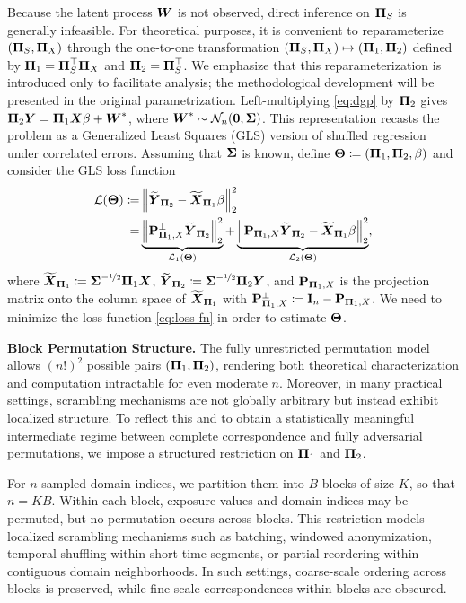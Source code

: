 \documentclass[numsec,webpdf,modern,medium,namedate]{oup-authoring-template}
\theoremstyle{thmstyleone}%
\theoremstyle{thmstyletwo}%
\theoremstyle{thmstylethree}%
\begin{document}
Because the latent process $\boldsymbol{W}$ is not observed, direct inference on $\boldsymbol{\Pi}_S$ is generally infeasible. For theoretical purposes, it is convenient to reparameterize $(\boldsymbol{\Pi}_S,\boldsymbol{\Pi}_X)$ through the one-to-one transformation $(\boldsymbol{\Pi}_S,\boldsymbol{\Pi}_X)\mapsto (\boldsymbol{\Pi}_1,\boldsymbol{\Pi}_2)$ defined by $\boldsymbol{\Pi}_1=\boldsymbol{\Pi}_S^\top \boldsymbol{\Pi}_X$ and $\boldsymbol{\Pi}_2=\boldsymbol{\Pi}_S^\top$. We emphasize that this reparameterization is introduced only to facilitate analysis; the methodological development will be presented in the original parametrization. Left-multiplying \eqref{eq:dgp} by $\boldsymbol{\Pi}_2$ gives $\boldsymbol{\Pi}_2 \boldsymbol{Y} = \boldsymbol{\Pi}_1 \boldsymbol{X} \beta + \boldsymbol{W}^\ast$, where $\boldsymbol{W}^\ast \sim \mathcal{N}_n(\boldsymbol{0},\boldsymbol{\Sigma})$. This representation recasts the problem as a Generalized Least Squares (GLS) version of shuffled regression under correlated errors.
Assuming that $\boldsymbol{\Sigma}$ is known, define $\boldsymbol{\Theta} \coloneqq \left(\boldsymbol{\Pi}_1, \boldsymbol{\Pi}_2, \beta \right)$ and consider the GLS loss function
\begin{equation}\label{eq:loss-fn}
    \begin{split}
            \mathcal{L}(\boldsymbol{\Theta})  \coloneqq & \left\|\widetilde{\boldsymbol{Y}}_{\boldsymbol{\Pi}_2} - \widetilde{\boldsymbol{X}}_{\boldsymbol{\Pi}_1}\beta\right\|^2_2 \\
     = & \underbrace{\left\|\mathbf{P}_{\boldsymbol{\Pi}_1,X}^\perp\widetilde{\boldsymbol{Y}}_{\boldsymbol{\Pi}_2}\right\|^2_2}_{\mathcal{L}_1(\boldsymbol{\Theta})} + \underbrace{\left\|\mathbf{P}_{\boldsymbol{\Pi}_1,X}\widetilde{\boldsymbol{Y}}_{\boldsymbol{\Pi}_2} - \widetilde{\boldsymbol{X}}_{\boldsymbol{\Pi}_1}\beta\right\|^2_2}_{\mathcal{L}_2(\boldsymbol{\Theta})}, 
    \end{split}
\end{equation}
where $\widetilde{\boldsymbol{X}}_{\boldsymbol{\Pi}_1} \coloneqq {\boldsymbol{\Sigma}}^{- \nicefrac{1}{2}}\boldsymbol{\Pi}_1 \boldsymbol{X}$, $\widetilde{\boldsymbol{Y}}_{\boldsymbol{\Pi}_2} \coloneqq {\boldsymbol{\Sigma}}^{-\nicefrac{1}{2}}\boldsymbol{\Pi}_2 \boldsymbol{Y}$, and $\mathbf{P}_{\boldsymbol{\Pi}_1,X}$ is the projection matrix onto the column space of $\widetilde{\boldsymbol{X}}_{\boldsymbol{\Pi}_1}$ with $\mathbf{P}_{\boldsymbol{\Pi}_1,X}^\perp\coloneq \mathbf{I}_n - \mathbf{P}_{\boldsymbol{\Pi}_1,X}$.
We need to minimize the loss function \eqref{eq:loss-fn} in order to estimate $\boldsymbol{\Theta}$.

\textbf{Block Permutation Structure.}
The fully unrestricted permutation model allows $(n!)^2$ possible pairs $(\boldsymbol{\Pi}_1,\boldsymbol{\Pi}_2)$, rendering both theoretical characterization and computation intractable for even moderate $n$. Moreover, in many practical settings, scrambling mechanisms are not globally arbitrary but instead exhibit localized structure. To reflect this and to obtain a statistically meaningful intermediate regime between complete correspondence and fully adversarial permutations, we impose a structured restriction on $\boldsymbol{\Pi}_1$ and $\boldsymbol{\Pi}_2$.

For $n$ sampled domain indices, we partition them into $B$ blocks of size $K$, so that $n = KB$. Within each block, exposure values and domain indices may be permuted, but no permutation occurs across blocks. This restriction models localized scrambling mechanisms such as batching, windowed anonymization, temporal shuffling within short time segments, or partial reordering within contiguous domain neighborhoods. In such settings, coarse-scale ordering across blocks is preserved, while fine-scale correspondences within blocks are obscured.
\end{document}
